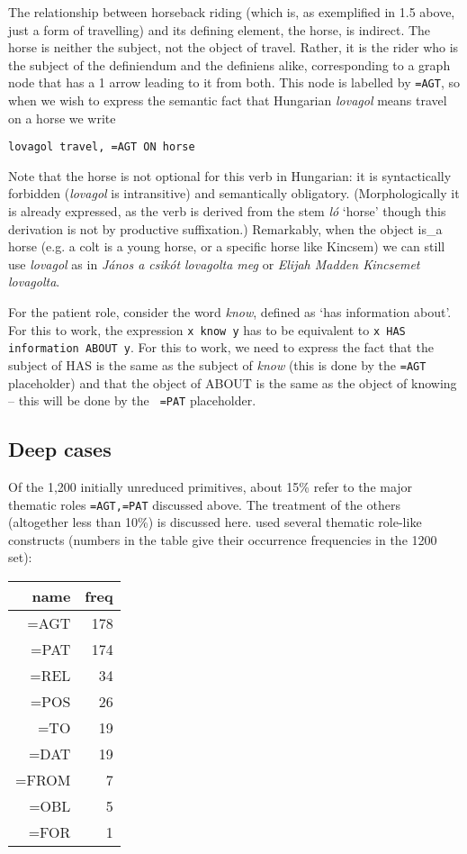 \documentclass[11pt,bookmarks,bookmarksnumbered,naturalnames,plainpages=false,pdftex,colorlinks=true,urlcolor=blue,bookmarksdepth=subsection,plainpages=false]{paper}
\begin{document}
The relationship between horseback riding (which is, as exemplified in 1.5
above, just a form of travelling) and its defining element, the horse, is
indirect. The horse is neither the subject, not the object of travel. 
Rather, it is the rider who is the subject of the definiendum and the
definiens alike, corresponding to a graph node that has a 1 arrow leading to
it from both. This node is labelled by {\tt =AGT}, so when we wish to express 
the semantic fact that Hungarian {\it lovagol} means travel on a horse we
write 

\begin{verbatim}
lovagol travel, =AGT ON horse
\end{verbatim} 

\noindent
Note that the horse is not optional for this verb in Hungarian: it is
syntactically forbidden ({\it lovagol} is intransitive) and semantically
obligatory. (Morphologically it is already expressed, as the verb is derived
from the stem {\it l\'o} `horse' though this derivation is not by productive
suffixation.) Remarkably, when the object is\_a horse (e.g. a colt is a young
horse, or a specific horse like Kincsem) we can still use {\it lovagol} as in
{\it J\'anos a csik\'ot lovagolta meg} or {\it Elijah Madden Kincsemet
  lovagolta}.

For the patient role, consider the word {\it know}, defined as `has
information about'. For this to work, the expression {\tt x know y} has to be
equivalent to {\tt x HAS information ABOUT y}. For this to work, we need to
express the fact that the subject of HAS is the same as the subject of {\it
  know} (this is done by the {\tt =AGT} placeholder) and that the object of
ABOUT is the same as the object of knowing -- this will be done by the {\tt
  =PAT} placeholder. 

\subsection{Deep cases}\label{deepcase}

Of the 1,200 initially unreduced primitives, about 15\% refer to the major
thematic roles {\tt =AGT,=PAT} discussed above. The treatment of the others
(altogether less than 10\%) is discussed here. \cite{Makrai:2014} used several 
thematic role-like constructs (numbers in the table give their occurrence
frequencies in the 1200 set):

\begin{tabular}{rr}
name & freq\\
\hline
=AGT & 178\\
=PAT & 174\\
=REL & 34\\
=POS & 26\\
=TO & 19\\
=DAT & 19\\
=FROM & 7\\
=OBL & 5\\
=FOR & 1\\
\end{tabular}
\end{document}
